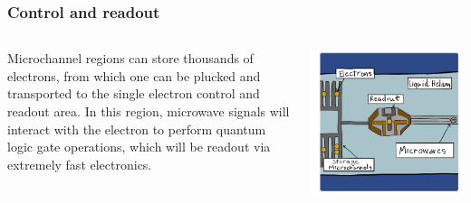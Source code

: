 \documentclass{beamer}
\begin{document}
\frame
    {
      \frametitle{Control and readout}
	
      \begin{footnotesize}
     \begin{columns}
       \column{5.0cm}

       Microchannel regions can store thousands of electrons, from which one can be plucked and transported to the single electron control and readout area. In this region, microwave signals will interact with the electron to perform quantum logic gate operations, which will be readout via extremely fast electronics.


\column{5cm}
      \begin{center}
	\includegraphics[width=1.2\textwidth]{qcfigures/nordicquantumfig3.png}
      \end{center}
\end{columns}
      \end{footnotesize}
    }
\end{document}
